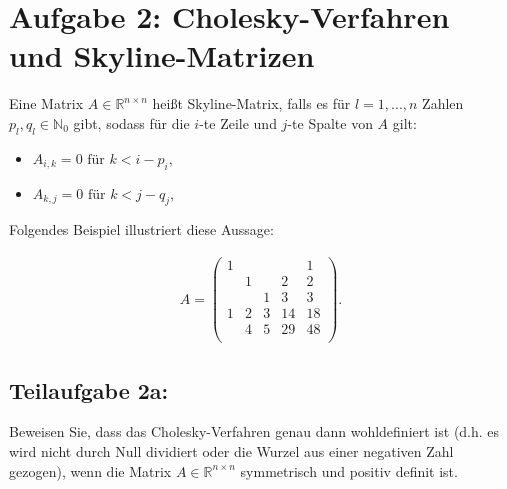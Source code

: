 \documentclass[]{article}
\begin{document}
\section*{Aufgabe 2: Cholesky-Verfahren und Skyline-Matrizen}
Eine Matrix $A \in \mathbb{R}^{n\times n}$ heißt Skyline-Matrix, falls es für $l = 1, ..., n$ Zahlen $p_l, q_l \in \mathbb{N}_0$ gibt, sodass für die $i$-te Zeile und $j$-te Spalte von $A$ gilt:

\begin{itemize}
	\item $A_{i,k} = 0 \text{ für } k < i - p_i$,
	\item $A_{k,j} = 0 \text{ für } k < j - q_j$,
\end{itemize}

Folgendes Beispiel illustriert diese Aussage:

\begin{align*}
	A = \begin{pmatrix}
		1 &   &   &   & 1 \\
		  & 1 &   & 2 & 2 \\
		  &   & 1 & 3 & 3 \\
		1 & 2 & 3 &14 &18 \\
		  & 4 & 5 &29 &48 \\
	\end{pmatrix}.
\end{align*}


\subsection*{Teilaufgabe 2a:}
Beweisen Sie, dass das Cholesky-Verfahren genau dann wohldefiniert ist (d.h. es wird nicht durch Null dividiert oder die Wurzel aus einer negativen Zahl gezogen), wenn die Matrix $A \in \mathbb{R}^{n\times n}$ symmetrisch und positiv definit ist.
\end{document}
